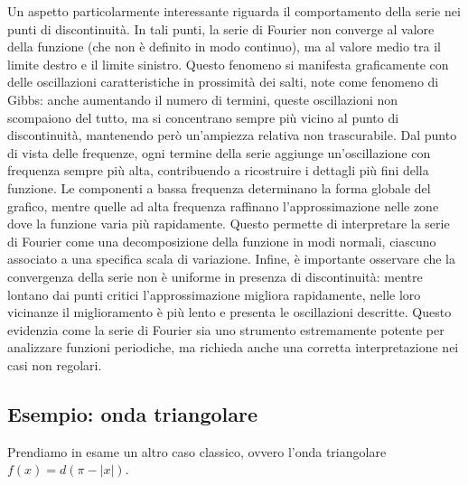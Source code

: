 \documentclass[a4paper,12pt]{report}
\begin{document}
Un aspetto particolarmente interessante riguarda il comportamento della serie nei punti di discontinuità. In tali punti, la serie di Fourier non converge al valore della funzione (che non è definito in modo continuo), ma al valore medio tra il limite destro e il limite sinistro. Questo fenomeno si manifesta graficamente con delle oscillazioni caratteristiche in prossimità dei salti, note come fenomeno di Gibbs: anche aumentando il numero di termini, queste oscillazioni non scompaiono del tutto, ma si concentrano sempre più vicino al punto di discontinuità, mantenendo però un’ampiezza relativa non trascurabile.
Dal punto di vista delle frequenze, ogni termine della serie aggiunge un’oscillazione con frequenza sempre più alta, contribuendo a ricostruire i dettagli più fini della funzione. Le componenti a bassa frequenza determinano la forma globale del grafico, mentre quelle ad alta frequenza raffinano l’approssimazione nelle zone dove la funzione varia più rapidamente. Questo permette di interpretare la serie di Fourier come una decomposizione della funzione in modi normali, ciascuno associato a una specifica scala di variazione. Infine, è importante osservare che la convergenza della serie non è uniforme in presenza di discontinuità: mentre lontano dai punti critici l’approssimazione migliora rapidamente, nelle loro vicinanze il miglioramento è più lento e presenta le oscillazioni descritte. Questo evidenzia come la serie di Fourier sia uno strumento estremamente potente per analizzare funzioni periodiche, ma richieda anche una corretta interpretazione nei casi non regolari.    
  
       
       
       
 


\newpage

\subsection{Esempio: onda triangolare}

Prendiamo in esame un altro caso classico, ovvero l'onda triangolare $f(x)=d(\pi-|x|)$.
\end{document}
